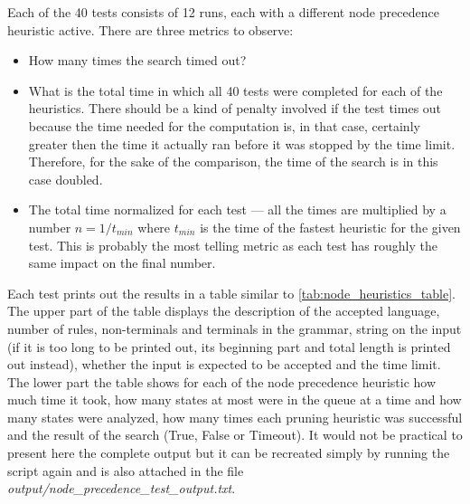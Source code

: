 Each of the 40 tests consists of 12 runs, each with a different node precedence heuristic active. There are three metrics to observe:
\begin{itemize}
  \item{How many times the search timed out?}

  \item{What is the total time in which all 40 tests were completed for each of the heuristics. There should be a kind of penalty involved if the test times out because the time needed for the computation is, in that case, certainly greater then the time it actually ran before it was stopped by the time limit. Therefore, for the sake of the comparison, the time of the search is in this case doubled.}

  \item{The total time normalized for each test --- all the times are multiplied by a number $n = 1 / t_{min}$ where $t_{min}$ is the time of the fastest heuristic for the given test. This is probably the most telling metric as each test has roughly the same impact on the final number.}
\end{itemize}

Each test prints out the results in a table similar to \ref{tab:node_heuristics_table}. The upper part of the table displays the description of the accepted language, number of rules, non-terminals and terminals in the grammar, string on the input (if it is too long to be printed out, its beginning part and total length is printed out instead), whether the input is expected to be accepted and the time limit. The lower part the table shows for each of the node precedence heuristic how much time it took, how many states at most were in the queue at a time and how many states were analyzed, how many times each pruning heuristic was successful and the result of the search (True, False or Timeout). It would not be practical to present here the complete output but it can be recreated simply by running the script again and is also attached in the file \textit{output/node\_precedence\_test\_output.txt}.

